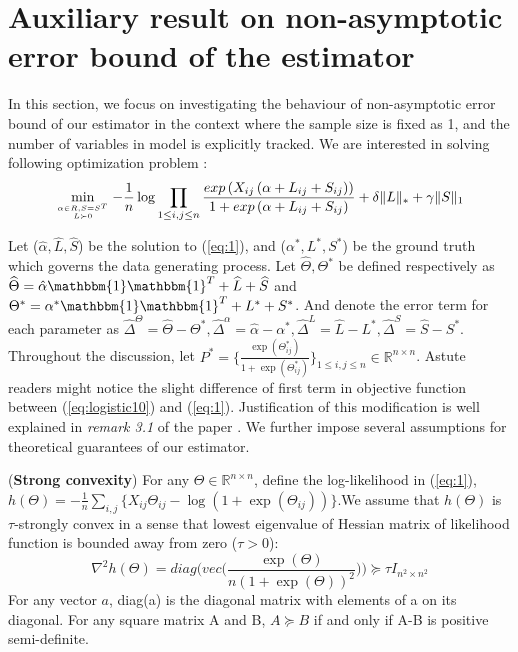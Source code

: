 \documentclass[AMS,STIX1COL]{WileyNJD-v2}
\begin{document}
\section{Auxiliary result on non-asymptotic error bound of the estimator}
In this section, we focus on investigating the behaviour of non-asymptotic error bound of our estimator in the context where the sample size is fixed as 1, and the number of variables in model is explicitly tracked. We are interested in solving following optimization problem :
\begin{equation}\label{eq:1}
\min\limits_{\alpha \in R, S = S^T \atop L \succ 0}
-\frac{1}{n} \log \prod_{1\le i,j\le n}\frac{exp\left(X_{ij}\left(\alpha+
L_{ij}+S_{ij}\right)\right)}{1+exp\left(\alpha+
L_{ij}+S_{ij}\right)} + \delta \|L\|_\ast + \gamma \|S\|_1
\end{equation}

Let ($\hat{\alpha},\widehat{L},\widehat{S}$) be the solution to (\ref{eq:1}), and ($\alpha^{*},L^{*},S^{*}$) be the ground truth which governs the data generating process.
Let $\widehat{\Theta},\Theta^{*}$ be defined respectively as $\widehat{\Theta} = \hat{\alpha}\mathbbm{1}\mathbbm{1}^T+\widehat{L}+\widehat{S}$ and $\Theta^{*} = \alpha^{*}\mathbbm{1}\mathbbm{1}^T+L^{*}+S^{*}$.
And denote the error term for each parameter as $\widehat{\Delta}^{\Theta} = \widehat{\Theta}-\Theta^{*},
\hat{\Delta}^{\alpha} = \hat{\alpha}-\alpha^{*},
\widehat{\Delta}^L = \widehat{L}-L^{*},
\widehat{\Delta}^S = \widehat{S}-S^{*}.$
Throughout the discussion, let $P^{*}=\big\{\frac{\exp(\Theta_{ij}^{*})}{1+\exp(\Theta_{ij}^{*})}\big\}_{1 \leq i,j \leq n} \in \mathbb{R}^{n \times n}$.
Astute readers might notice the slight difference of first term in objective function between (\ref{eq:logistic10})
and (\ref{eq:1}).
Justification of this modification is well explained in \emph{remark 3.1} of the paper \cite{ma2017exploration}.
We further impose several assumptions for theoretical guarantees of our estimator.

\begin{assumption}(\textbf{Strong convexity})  \label{Ass:1}
For any $\Theta \in \mathbb{R}^{n\times n}$, define the log-likelihood in (\ref{eq:1}), $h(\Theta) = -\frac{1}{n}\sum_{i,j} \big\{ X_{ij}\Theta_{ij} - \log(1+\exp(\Theta_{ij})) \big\}$.We assume that $h(\Theta)$ is $\tau$-strongly convex in a sense that lowest eigenvalue of Hessian matrix of likelihood function is bounded away from zero ($\tau > 0$):
\[
\nabla^{2}h(\Theta) = diag\Big(vec\Big(\frac{\exp(\Theta)}{n(1+\exp(\Theta))^{2}}
\Big)\Big) \succcurlyeq \tau I_{n^{2} \times n^{2}}
\]
For any vector $a$, diag(a) is the diagonal matrix with elements of a on its diagonal. For any square matrix A and B, $ A \succcurlyeq B $ if and only if A-B is positive semi-definite.
\end{assumption}
\end{document}
